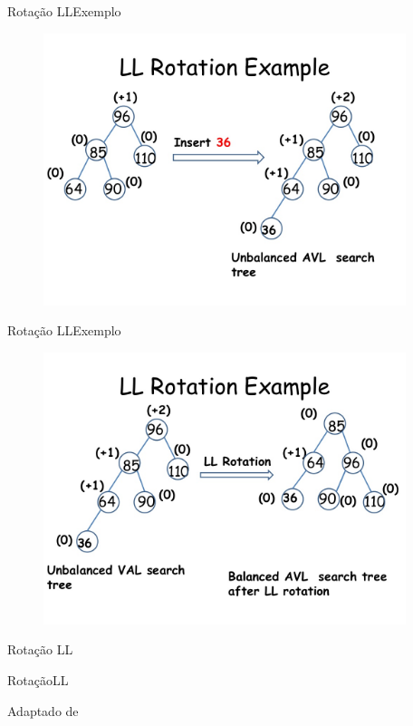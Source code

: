 \documentclass[aspectratio=169]{beamer}
\begin{document}
\begin{frame}{Rotação LL}{Exemplo}
\begin{figure}[!h]
  \centering
  \includegraphics[width=300pt]{imagens/ll_rotation_example.png}
  \label{fig_ll_rotation_example}
\end{figure}
\end{frame}


\begin{frame}{Rotação LL}{Exemplo}
\begin{figure}[!h]
  \centering
  \includegraphics[width=300pt]{imagens/ll_rotation_example1.png}
  \label{fig_ll_rotation_example1}
\end{figure}
\end{frame}

\begin{frame}{Rotação LL}
\begin{algorithm}[H]
\caption{RotaçãoLL} 
\label{RotacaoLL}
\end{algorithm}
\tiny{Adaptado de \cite{Backes2016}}  
\end{frame}
\end{document}
